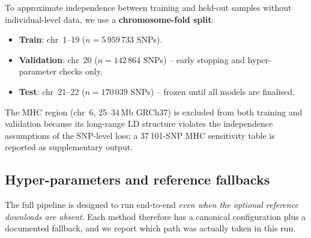 To approximate independence between training and held-out samples
without individual-level data, we use a \textbf{chromosome-fold split}:
\begin{itemize}[nosep,leftmargin=1.2em]
  \item \textbf{Train}: chr~1--19 ($n = 5\,959\,733$ SNPs).
  \item \textbf{Validation}: chr~20 ($n = 142\,864$ SNPs) -- early
        stopping and hyper-parameter checks only.
  \item \textbf{Test}: chr~21--22 ($n = 170\,039$ SNPs) -- frozen
        until all models are finalised.
\end{itemize}
The MHC region (chr~6, 25--34\,Mb GRCh37) is excluded from both
training and validation because its long-range LD structure violates
the independence assumptions of the SNP-level loss; a 37\,101-SNP MHC
sensitivity table is reported as supplementary output.

\subsection{Hyper-parameters and reference fallbacks}
\label{sec:hyperparams}

The full pipeline is designed to run end-to-end \textit{even when the
optional reference downloads are absent}. Each method therefore has a
canonical configuration plus a documented fallback, and we report
which path was actually taken in this run.

